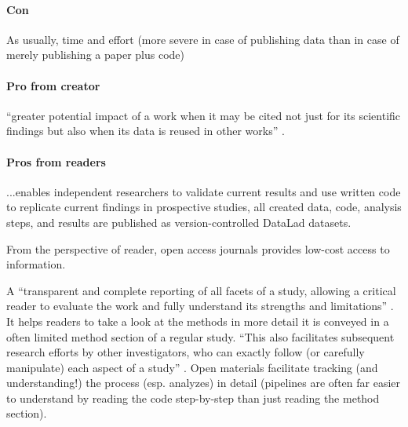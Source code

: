 \paragraph{Con}

As usually, time and effort (more severe in case of publishing data than in case
of merely publishing a paper plus code)

\paragraph{Pro from creator}


``greater potential impact of a work when it may be cited not just for its
scientific findings but also when its data is reused in other works''
\citep{nichols2017best}.


\paragraph{Pros from readers}


...enables independent researchers to validate current results and use written
code to replicate current findings in prospective studies, all created data,
code, analysis steps, and results are published as version-controlled DataLad
\citep[\href{www.datalad.org}{datalad.org};][]{halchenko2021datalad} datasets.

%
From the perspective of reader, open access journals provides low-cost access to
information.

A ``transparent and complete reporting of all facets of a study, allowing a
critical reader to evaluate the work and fully understand its strengths and
limitations'' \citep{nichols2017best}.
%
It helps readers to take a look at the methods in more detail it is conveyed in
a often limited method section of a regular study.
%
``This also facilitates subsequent research efforts by other investigators, who
can exactly follow (or carefully manipulate) each aspect of a study''
\citep{nichols2017best}.
%
Open materials facilitate tracking (and understanding!) the process (esp.
analyzes) in detail (pipelines are often far easier to understand by reading the
code step-by-step than just reading the method section).

